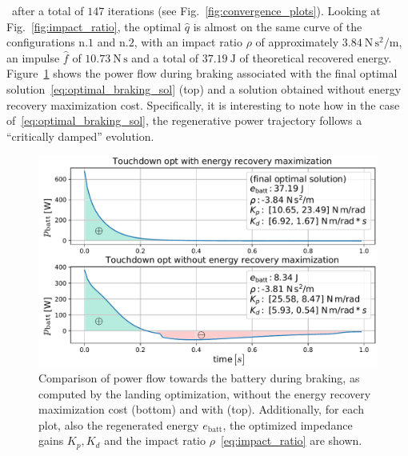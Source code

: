 ~\hspace{-0.55cm}after a total of $147$ iterations (see Fig.~\ref{fig:convergence_plots}). Looking at Fig.~\ref{fig:impact_ratio}, the optimal $\hat{q}$ is almost on the same curve of the configurations n.$1$ and n.$2$, with an impact ratio $\rho$ of approximately $3.84~\mathrm{N\,s^{2}/m}$, an impulse $\hat{f}$ of $10.73~\mathrm{N\,s}$ and a total of $37.19~\mathrm{J}$ of theoretical recovered energy. Figure~\ref{fig:critically_damped_pow} shows the power flow during braking associated with the final optimal solution~\eqref{eq:optimal_braking_sol} (top) and a solution obtained without energy recovery maximization cost. Specifically, it is interesting to note how in the case of~\eqref{eq:optimal_braking_sol}, the regenerative power trajectory follows a \enquote{critically damped} evolution. 
\begin{figure}[h]
	\centering
	\includegraphics[width=1\columnwidth]{images/critically_damped_vs_no_reg_pow_max.pdf}
	\caption{Comparison of power flow towards the battery during braking, as computed by the landing optimization, without the energy recovery maximization cost (bottom) and with (top). Additionally, for each plot, also the regenerated energy $e_{\mathrm{batt}}$, the optimized impedance gains $K_p, K_d$ and the impact ratio $\rho$~\eqref{eq:impact_ratio} are shown.}
	\label{fig:critically_damped_pow}
\end{figure}

